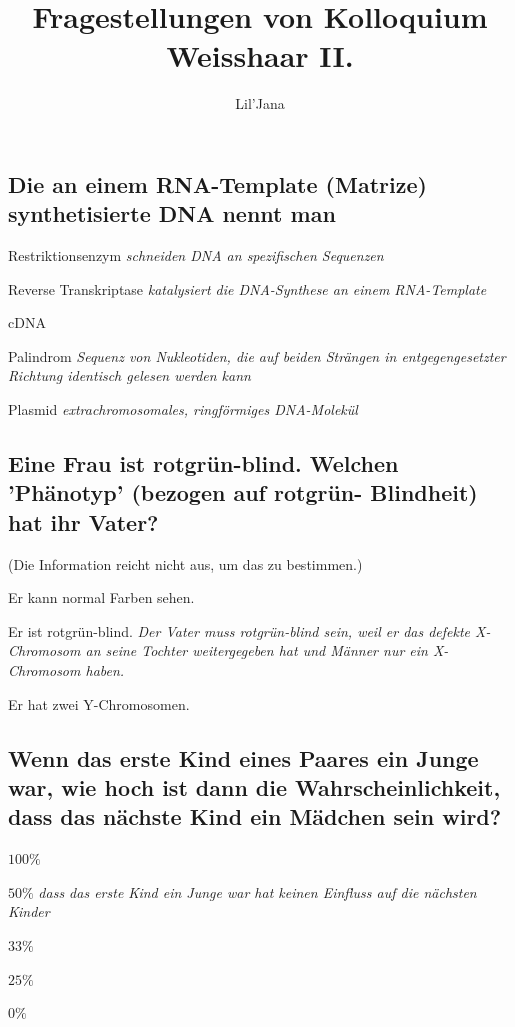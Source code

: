 \documentclass{article}
\title{Fragestellungen von Kolloquium Weisshaar II.}
\author{Lil'Jana}
\newcommand{\cmark}{\ding{51}}%
\newcommand{\done}{\rlap{$\square$}{\raisebox{2pt}{\large\hspace{1pt}\cmark}}%
\hspace{-2.5pt}}
\begin{document}
\maketitle
\subsection*{Die an einem RNA-Template (Matrize) synthetisierte DNA nennt man}
\begin{todolist}%
\item Restriktionsenzym \textit{\scriptsize schneiden DNA an spezifischen Sequenzen}
\item Reverse Transkriptase \textit{\scriptsize katalysiert die DNA-Synthese an einem RNA-Template}
\item [\done] cDNA
\item Palindrom \textit{\scriptsize Sequenz von Nukleotiden, die auf beiden Strängen in entgegengesetzter Richtung identisch gelesen werden kann}
\item Plasmid \textit{\scriptsize extrachromosomales, ringförmiges DNA-Molekül}
\end{todolist}
\subsection*{Eine Frau ist rotgrün-blind. Welchen 'Phänotyp' (bezogen auf rotgrün-
Blindheit) hat ihr Vater?}
\begin{todolist}%
\item (Die Information reicht nicht aus, um das zu bestimmen.)
\item Er kann normal Farben sehen. 
\item [\done] Er ist rotgrün-blind. \textit{\scriptsize Der Vater muss rotgrün-blind sein, weil er das defekte X-Chromosom an seine Tochter weitergegeben hat und Männer nur ein X-Chromosom haben.}
\item Er hat zwei Y-Chromosomen.
\end{todolist}
\subsection*{Wenn das erste Kind eines Paares ein Junge war, wie hoch ist dann die
Wahrscheinlichkeit, dass das nächste Kind ein Mädchen sein wird?}
\begin{todolist}%
\item $100\%$
\item[\done] $50\%$  \textit{\scriptsize dass das erste Kind ein Junge war hat keinen Einfluss auf die nächsten Kinder}
\item $33\%$
\item $25\%$
\item $0\%$
\end{todolist}
\end{document}
